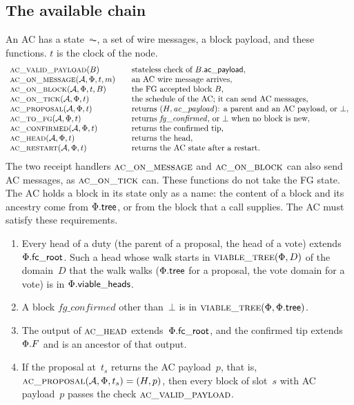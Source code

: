 \subsection{The available chain}\label{sec:ac-interface}

An AC has a state~$\AC$, a set of wire messages, a block payload, and
these functions.  $t$ is the clock of the node.
\[
\begin{array}{l@{\qquad}l}
 \Call{ac\_valid\_payload}{B} & \text{stateless check of $B.\acp$},\\
 \Call{ac\_on\_message}{\AC,\Fr,t,m} & \text{an AC wire message arrives},\\
 \Call{ac\_on\_block}{\AC,\Fr,t,B} & \text{the FG accepted block $B$},\\
 \Call{ac\_on\_tick}{\AC,\Fr,t} & \text{the schedule of the AC; it can
   send AC messages},\\
 \Call{ac\_proposal}{\AC,\Fr,t} & \text{returns
   $(H,\mathit{ac\_payload})$: a parent and an AC payload, or $\bot$},\\
 \Call{ac\_to\_fg}{\AC,\Fr,t} & \text{returns
   $\mathit{fg\_confirmed}$, or $\bot$ when no block is new},\\
 \Call{ac\_confirmed}{\AC,\Fr,t} & \text{returns the confirmed tip},\\
 \Call{ac\_head}{\AC,\Fr,t} & \text{returns the head},\\
 \Call{ac\_restart}{\AC,\Fr,t} & \text{returns the AC state after a restart}.
\end{array}
\]
The two receipt handlers $\Call{ac\_on\_message}{}$ and
$\Call{ac\_on\_block}{}$ can also send AC messages, as
$\Call{ac\_on\_tick}{}$ can.  These functions do not take the FG state.  The AC holds a block in its state only as
a name: the content of a block and its ancestry come from $\Phi.\mathsf{tree}$, or
from the block that a call supplies.  The AC must satisfy these
requirements.
\begin{enumerate}
\item Every head of a duty (the parent of a proposal, the head of a vote)
  extends~$\Phi.\mathsf{fc\_root}$.
  Such a head whose walk starts in $\text{\textsc{viable\_tree}}(\Phi,D)$ of the domain~$D$
  that the walk walks ($\Phi.\mathsf{tree}$ for a proposal, the vote domain for a
  vote) is in $\Phi.\mathsf{viable\_heads}$.
\item A block $\mathit{fg\_confirmed}$ other than~$\bot$ is in
  $\text{\textsc{viable\_tree}}(\Phi,\Phi.\mathsf{tree})$.
\item The output of $\Call{ac\_head}{}$ extends~$\Phi.\mathsf{fc\_root}$, and the
  confirmed tip extends~$\Phi.F$ and is an ancestor of that output.
\item[5.] If the proposal at~$t_s$ returns the AC payload~$p$, that is,
  $\Call{ac\_proposal}{\AC,\Fr,t_s}=(H,p)$, then every block of slot~$s$
  with AC payload~$p$ passes the check $\Call{ac\_valid\_payload}{}$.
\end{enumerate}

